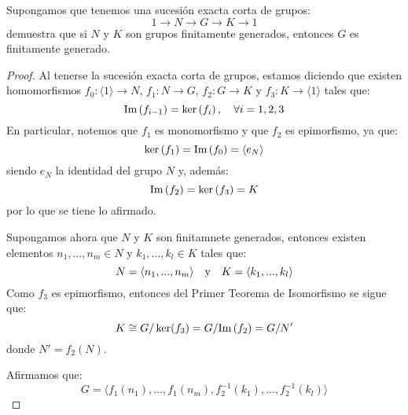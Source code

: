 \documentclass[12pt]{report}
\newcounter{it}
\theoremstyle{largebreak}
\newcommand\cf[3]{\ensuremath{#1:#2\rightarrow#3}}
\newcommand{\gen}[1]{\ensuremath{\langle#1\rangle}}
\newcommand{\im}[1]{\ensuremath{\textup{Im}\left(#1\right)}}
\begin{document}
    \begin{excer}
        Supongamos que tenemos una sucesión exacta corta de grupos:
        \begin{equation*}
            1\rightarrow N\rightarrow G\rightarrow K\rightarrow 1
        \end{equation*}
        demuestra que si $N$ y $K$ son grupos finitamente generados, entonces $G$ es finitamente generado.
    \end{excer}

    \begin{proof}
        Al tenerse la sucesión exacta corta de grupos, estamos diciendo que existen homomorfismos $\cf{f_0}{\gen{1}}{N}$, $\cf{f_1}{N}{G}$, $\cf{f_2}{G}{K}$ y $\cf{f_3}{K}{\gen{1}}$ tales que:
        \begin{equation*}
            \im{f_{i-1}}=\ker\left(f_i \right),\quad\forall i=1,2,3
        \end{equation*}
        En particular, notemos que $f_1$ es monomorfismo y que $f_2$ es epimorfismo, ya que:
        \begin{equation*}
            \ker\left(f_1\right)=\im{f_0}=\gen{e_N}
        \end{equation*}
        siendo $e_N$ la identidad del grupo $N$ y, además:
        \begin{equation*}
            \im{f_2}=\ker\left(f_3\right)=K
        \end{equation*}
        por lo que se tiene lo afirmado.

        Supongamos ahora que $N$ y $K$ son finitamnete generados, entonces existen elementos $n_1,...,n_m\in N$ y $k_1,...,k_l\in K$ tales que:
        \begin{equation*}
            N=\gen{n_1,...,n_m}\quad\textup{y}\quad K=\gen{k_1,...,k_l}
        \end{equation*}
        Como $f_3$ es epimorfismo, entonces del Primer Teorema de Isomorfismo se sigue que:
        \begin{equation*}
            K\cong G/\ker(f_3)=G/\im{f_2}=G/N'
        \end{equation*}
        donde $N'=f_2(N)$.
        
        Afirmamos que:
        \begin{equation*}
            G=\gen{f_1(n_1),...,f_1(n_m),f_2^{-1}(k_1),...,f_2^{-1}(k_l)}
        \end{equation*}

    \end{proof}
\end{document}

